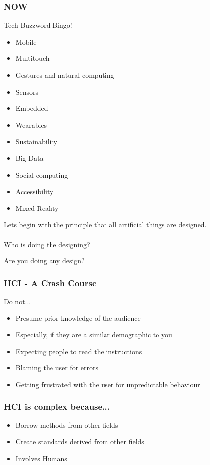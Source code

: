 \begin{frame}
	\frametitle{NOW}
	\begin{center}
		Tech Buzzword Bingo!
	\end{center}
	\begin{itemize}
		\item Mobile
		\item Multitouch
		\item Gestures and natural computing
		\item Sensors
		\item Embedded
		\item Wearables
		\item Sustainability
		\item Big Data
		\item Social computing
		\item Accessibility
		\item Mixed Reality
	\end{itemize}
\end{frame}

\begin{frame}
	Lets begin with the principle that all artificial things are designed. \\ ~ \\
	
	Who is doing the designing?
	\begin{center}
		\pause Are you doing any design? 
	\end{center}
\end{frame}

\begin{frame}
	\frametitle{HCI - A Crash Course}
	\begin{center}
		\huge Do not...
	\end{center}
	\begin{itemize}
		\item Presume prior knowledge of the audience
		\item Especially, if they are a similar demographic to you
		\item Expecting people to read the instructions
		\item Blaming the user for errors
		\item Getting frustrated with the user for unpredictable behaviour
	\end{itemize}
\end{frame}

\begin{frame}
	\frametitle{HCI is complex because...}
	\begin{itemize}
		\item Borrow methods from other fields
		\item Create standards derived from other fields
		\item Involves Humans
	\end{itemize}
\end{frame}

